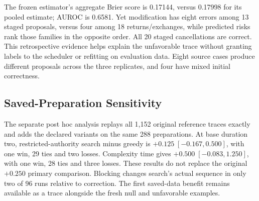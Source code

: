 The frozen estimator's aggregate Brier score is 0.17144, versus 0.17998 for its pooled estimate; AUROC is 0.6581. Yet modification has eight errors among 13 staged proposals, versus four among 18 returns/exchanges, while predicted risks rank those families in the opposite order. All 20 staged cancellations are correct. This retrospective evidence helps explain the unfavorable trace without granting labels to the scheduler or refitting on evaluation data. Eight source cases produce different proposals across the three replicates, and four have mixed initial correctness.

\subsection{Saved-Preparation Sensitivity}

The separate post hoc analysis replays all 1,152 original reference traces exactly and adds the declared variants on the same 288 preparations. At base duration two, restricted-authority search minus greedy is $+0.125\;[-0.167,0.500]$, with one win, 29 ties and two losses. Complexity time gives $+0.500\;[-0.083,1.250]$, with one win, 28 ties and three losses. These results do not replace the original $+0.250$ primary comparison. Blocking changes search's actual sequence in only two of 96 runs relative to correction. The first saved-data benefit remains available as a trace alongside the fresh null and unfavorable examples.
